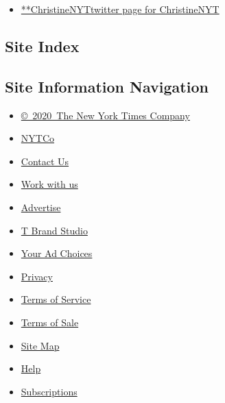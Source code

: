 \begin{itemize}
\tightlist
\item
  \href{https://twitter.com/ChristineNYT}{**ChristineNYTtwitter page for
  ChristineNYT}
\end{itemize}

\hypertarget{site-index}{%
\subsection{Site Index}\label{site-index}}

\hypertarget{site-information-navigation}{%
\subsection{Site Information
Navigation}\label{site-information-navigation}}

\begin{itemize}
\tightlist
\item
  \href{https://help.nytimes3xbfgragh.onion/hc/en-us/articles/115014792127-Copyright-notice}{©~2020~The
  New York Times Company}
\end{itemize}

\begin{itemize}
\tightlist
\item
  \href{https://www.nytco.com/}{NYTCo}
\item
  \href{https://help.nytimes3xbfgragh.onion/hc/en-us/articles/115015385887-Contact-Us}{Contact
  Us}
\item
  \href{https://www.nytco.com/careers/}{Work with us}
\item
  \href{https://nytmediakit.com/}{Advertise}
\item
  \href{http://www.tbrandstudio.com/}{T Brand Studio}
\item
  \href{https://www.nytimes3xbfgragh.onion/privacy/cookie-policy\#how-do-i-manage-trackers}{Your
  Ad Choices}
\item
  \href{https://www.nytimes3xbfgragh.onion/privacy}{Privacy}
\item
  \href{https://help.nytimes3xbfgragh.onion/hc/en-us/articles/115014893428-Terms-of-service}{Terms
  of Service}
\item
  \href{https://help.nytimes3xbfgragh.onion/hc/en-us/articles/115014893968-Terms-of-sale}{Terms
  of Sale}
\item
  \href{https://spiderbites.nytimes3xbfgragh.onion}{Site Map}
\item
  \href{https://help.nytimes3xbfgragh.onion/hc/en-us}{Help}
\item
  \href{https://www.nytimes3xbfgragh.onion/subscription?campaignId=37WXW}{Subscriptions}
\end{itemize}
